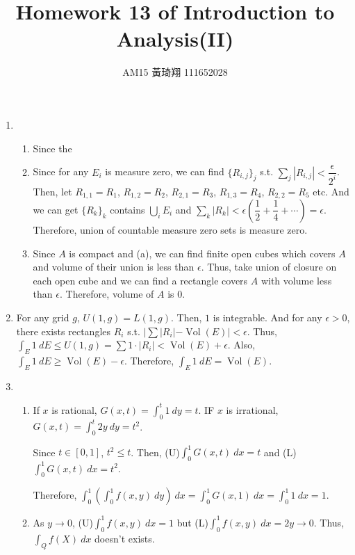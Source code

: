 \documentclass[12pt]{article}
\title{Homework 13 of Introduction to Analysis(II)}
\author{AM15 黃琦翔 111652028}
\DeclareMathOperator{\volume}{Vol}
\begin{document}
\maketitle
\begin{enumerate}
    \item \begin{enumerate}
        \item Since the 

        \item Since for any $E_i$ is measure zero, we can find $\{ R_{i, j}\}_j$ s.t. 
        $\displaystyle\sum_{j} |R_{i, j}| < \dfrac{\epsilon}{2^{i}}$.
        Then, let $R_{1, 1} = R_1$, $R_{1,2} = R_2$, $R_{2, 1} = R_3$, $R_{1, 3} = R_4$, $R_{2, 2} = R_5$ etc.
        And we can get $\{ R_k\}_k$ contains $\displaystyle\bigcup_i E_i$ and $\displaystyle\sum_{k} |R_k| < \epsilon(\dfrac{1}{2} + \dfrac{1}{4} + \cdots) = \epsilon$.
        Therefore, union of countable measure zero sets is measure zero.

        \item Since $A$ is compact and (a), we can find finite open cubes which covers $A$ and volume of their union is less than $\epsilon$.
        Thus, take union of closure on each open cube and we can find a rectangle covers $A$ with volume less than $\epsilon$.
        Therefore, volume of $A$ is $0$.
    \end{enumerate}

    \item For any grid $g$, $U(1, g) = L(1, g)$. Then, $1$ is integrable.
    And for any $\epsilon > 0$, there exists rectangles $R_i$ s.t. $|\sum |R_i| - \volume(E)| <\epsilon$.
    Thus, $\displaystyle\int_E 1\ dE \leq U(1, g) = \sum 1 \cdot |R_i| < \volume(E) + \epsilon$.
    Also, $\displaystyle\int_E 1\ dE \geq \volume(E) - \epsilon$.
    Therefore, $\displaystyle\int_E 1\ dE = \volume(E)$.

    \item \begin{enumerate}
        \item If $x$ is rational, $G(x, t) = \displaystyle\int_{0}^{t} 1\ dy = t$.
        IF $x$ is irrational, $G(x, t) = \displaystyle\int_{0}^{t} 2y\ dy = t^2$.

        Since $t \in [0, 1]$, $t^2 \leq t$.
        Then, (U)$\displaystyle\int_{0}^{1} G(x, t)\ dx = t$ and (L)$\displaystyle\int_{0}^{1} G(x, t)\ dx = t^2$.

        Therefore, $\displaystyle\int_{0}^{1} (\displaystyle\int_{0}^{1} f(x, y)\ dy)\ dx = \displaystyle\int_{0}^{1} G(x, 1)\ dx = \displaystyle\int_{0}^{1} 1\ dx = 1$.

        \item As $y \to 0$, (U)$\displaystyle\int_{0}^{1} f(x, y)\ dx = 1$ but (L)$\displaystyle\int_{0}^{1} f(x, y)\ dx = 2y \to 0$.
        Thus, $\displaystyle\int_{Q} f(X)\ dx$ doesn't exists.
    \end{enumerate}
\end{enumerate}
\end{document}

